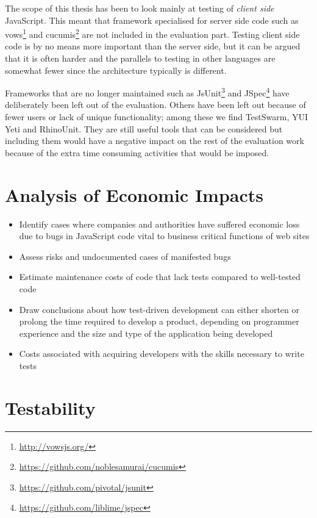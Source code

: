 \documentclass[11pt]{article}
\begin{document}
The scope of this thesis has been to look mainly at testing of \emph{client side} JavaScript. This meant that framework specialised for server side code such as vows\footnote{\url{http://vowsjs.org/}} and cucumis\footnote{\url{https://github.com/noblesamurai/cucumis}} are not included in the evaluation part. Testing client side code is by no means more important than the server side, but it can be argued that it is often harder and the parallels to testing in other languages are somewhat fewer since the architecture typically is different.

Frameworks that are no longer maintained such as JsUnit\footnote{\url{https://github.com/pivotal/jsunit}} and JSpec\footnote{\url{https://github.com/liblime/jspec}} have deliberately been left out of the evaluation. Others have been left out because of fewer users or lack of unique functionality; among these we find TestSwarm, YUI Yeti and RhinoUnit. They are still useful tools that can be considered but including them would have a negative impact on the rest of the evaluation work because of the extra time consuming activities that would be imposed.

\section{Analysis of Economic Impacts}

\begin{itemize}
  \item Identify cases where companies and authorities have suffered economic loss due to bugs in JavaScript code vital to business critical functions of web sites
  \item Assess risks and undocumented cases of manifested bugs
  \item Estimate maintenance costs of code that lack tests compared to well-tested code
  \item Draw conclusions about how test-driven development can either shorten or prolong the time required to develop a product, depending on programmer experience and the size and type of the application being developed
  \item Costs associated with acquiring developers with the skills necessary to write tests
\end{itemize}

\section{Testability}
\end{document}
